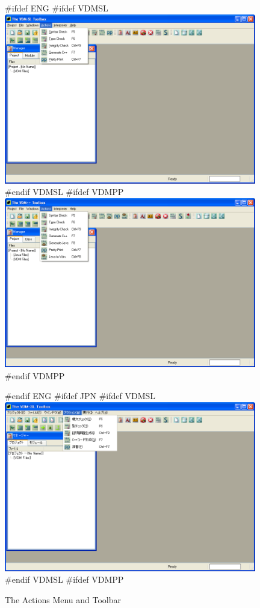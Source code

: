 \documentclass[\pformat,12pt]{article}
\begin{document}
\begin{figure}[tbh]
\begin{center}
\mbox{}
#ifdef ENG
#ifdef VDMSL
\includegraphics[width=11cm]{actionsMenuToolbar-slENG.png}
#endif VDMSL
#ifdef VDMPP
\includegraphics[width=11cm]{actionsMenuToolbar-ppENG.png}
#endif VDMPP
\caption{The Actions Menu and Toolbar}
#endif ENG
#ifdef JPN
#ifdef VDMSL
\includegraphics[width=11cm]{actionsMenuToolbar-sl.png}
#endif VDMSL
#ifdef VDMPP

\end{center}
\end{figure}
\end{document}
